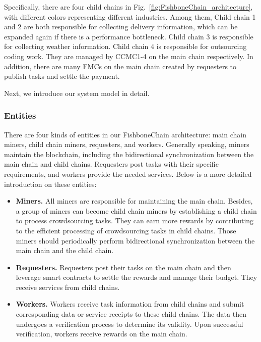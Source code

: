 \documentclass[10pt,journal]{IEEEtran}
\begin{document}
Specifically, there are four child chains in Fig.~\ref{fig:FishboneChain_architecture}, with different colors representing different industries. Among them, Child chain 1 and 2 are both responsible for collecting delivery information, which can be expanded again if there is a performance bottleneck. Child chain 3 is responsible for collecting weather information. Child chain 4 is responsible for outsourcing coding work. They are managed by CCMC1-4 on the main chain respectively. In addition, there are many FMCs on the main chain created by requesters to publish tasks and settle the payment.

Next, we introduce our system model in detail.

\subsubsection{\textbf{Entities}}
There are four kinds of entities in our FishboneChain architecture: main chain miners, child chain miners, requesters, and workers. Generally speaking, miners maintain the blockchain, including the bidirectional synchronization between the main chain and child chains. Requesters post tasks with their specific requirements, and workers provide the needed services.
Below is a more detailed introduction on these entities:

\begin{itemize}
    \item \textbf{Miners.}
    All miners are responsible for maintaining the main chain. Besides, a group of miners can become child chain miners by establishing a child chain to process crowdsourcing tasks. They can earn more rewards by contributing to the efficient processing of crowdsourcing tasks in child chains. Those miners should periodically perform bidirectional synchronization between the main chain and the child chain.

    \item \textbf{Requesters.} Requesters post their tasks on the main chain and then leverage smart contracts to settle the rewards and manage their budget. They receive services from child chains.

    \item \textbf{Workers.} Workers receive task information from child chains and submit corresponding data or service receipts to these child chains. The data then undergoes a verification process to determine its validity. Upon successful verification, workers receive rewards on the main chain.
\end{itemize}
\end{document}
